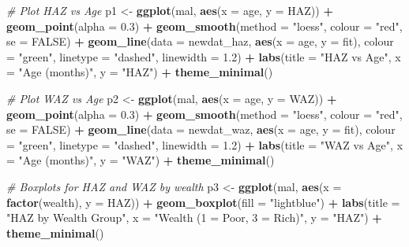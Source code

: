 \documentclass[
  letterpaper,
]{krantz}
\newenvironment{Shaded}{\begin{snugshade}}{\end{snugshade}}
\newcommand{\AttributeTok}[1]{\textcolor[rgb]{0.13,0.29,0.53}{#1}}
\newcommand{\CommentTok}[1]{\textcolor[rgb]{0.56,0.35,0.01}{\textit{#1}}}
\newcommand{\ConstantTok}[1]{\textcolor[rgb]{0.56,0.35,0.01}{#1}}
\newcommand{\FloatTok}[1]{\textcolor[rgb]{0.00,0.00,0.81}{#1}}
\newcommand{\FunctionTok}[1]{\textcolor[rgb]{0.13,0.29,0.53}{\textbf{#1}}}
\newcommand{\NormalTok}[1]{#1}
\newcommand{\OtherTok}[1]{\textcolor[rgb]{0.56,0.35,0.01}{#1}}
\newcommand{\SpecialCharTok}[1]{\textcolor[rgb]{0.81,0.36,0.00}{\textbf{#1}}}
\newcommand{\StringTok}[1]{\textcolor[rgb]{0.31,0.60,0.02}{#1}}
\begin{document}
\begin{Shaded}
\begin{Highlighting}[]
\CommentTok{\# Plot HAZ vs Age}
\NormalTok{p1 }\OtherTok{\textless{}{-}} \FunctionTok{ggplot}\NormalTok{(mal, }\FunctionTok{aes}\NormalTok{(}\AttributeTok{x =}\NormalTok{ age, }\AttributeTok{y =}\NormalTok{ HAZ)) }\SpecialCharTok{+}
  \FunctionTok{geom\_point}\NormalTok{(}\AttributeTok{alpha =} \FloatTok{0.3}\NormalTok{) }\SpecialCharTok{+}
  \FunctionTok{geom\_smooth}\NormalTok{(}\AttributeTok{method =} \StringTok{"loess"}\NormalTok{, }\AttributeTok{colour =} \StringTok{"red"}\NormalTok{, }\AttributeTok{se =} \ConstantTok{FALSE}\NormalTok{) }\SpecialCharTok{+}
  \FunctionTok{geom\_line}\NormalTok{(}\AttributeTok{data =}\NormalTok{ newdat\_haz, }\FunctionTok{aes}\NormalTok{(}\AttributeTok{x =}\NormalTok{ age, }\AttributeTok{y =}\NormalTok{ fit), }
            \AttributeTok{colour =} \StringTok{"green"}\NormalTok{, }\AttributeTok{linetype =} \StringTok{"dashed"}\NormalTok{, }\AttributeTok{linewidth =} \FloatTok{1.2}\NormalTok{) }\SpecialCharTok{+}
  \FunctionTok{labs}\NormalTok{(}\AttributeTok{title =} \StringTok{"HAZ vs Age"}\NormalTok{, }\AttributeTok{x =} \StringTok{"Age (months)"}\NormalTok{, }\AttributeTok{y =} \StringTok{"HAZ"}\NormalTok{) }\SpecialCharTok{+}
  \FunctionTok{theme\_minimal}\NormalTok{()}

\CommentTok{\# Plot WAZ vs Age}
\NormalTok{p2 }\OtherTok{\textless{}{-}} \FunctionTok{ggplot}\NormalTok{(mal, }\FunctionTok{aes}\NormalTok{(}\AttributeTok{x =}\NormalTok{ age, }\AttributeTok{y =}\NormalTok{ WAZ)) }\SpecialCharTok{+}
  \FunctionTok{geom\_point}\NormalTok{(}\AttributeTok{alpha =} \FloatTok{0.3}\NormalTok{) }\SpecialCharTok{+}
  \FunctionTok{geom\_smooth}\NormalTok{(}\AttributeTok{method =} \StringTok{"loess"}\NormalTok{, }\AttributeTok{colour =} \StringTok{"red"}\NormalTok{, }\AttributeTok{se =} \ConstantTok{FALSE}\NormalTok{) }\SpecialCharTok{+}
  \FunctionTok{geom\_line}\NormalTok{(}\AttributeTok{data =}\NormalTok{ newdat\_waz, }\FunctionTok{aes}\NormalTok{(}\AttributeTok{x =}\NormalTok{ age, }\AttributeTok{y =}\NormalTok{ fit), }
            \AttributeTok{colour =} \StringTok{"green"}\NormalTok{, }\AttributeTok{linetype =} \StringTok{"dashed"}\NormalTok{, }\AttributeTok{linewidth =} \FloatTok{1.2}\NormalTok{) }\SpecialCharTok{+}
  \FunctionTok{labs}\NormalTok{(}\AttributeTok{title =} \StringTok{"WAZ vs Age"}\NormalTok{, }\AttributeTok{x =} \StringTok{"Age (months)"}\NormalTok{, }\AttributeTok{y =} \StringTok{"WAZ"}\NormalTok{) }\SpecialCharTok{+}
  \FunctionTok{theme\_minimal}\NormalTok{()}

\CommentTok{\# Boxplots for HAZ and WAZ by wealth}
\NormalTok{p3 }\OtherTok{\textless{}{-}} \FunctionTok{ggplot}\NormalTok{(mal, }\FunctionTok{aes}\NormalTok{(}\AttributeTok{x =} \FunctionTok{factor}\NormalTok{(wealth), }\AttributeTok{y =}\NormalTok{ HAZ)) }\SpecialCharTok{+}
  \FunctionTok{geom\_boxplot}\NormalTok{(}\AttributeTok{fill =} \StringTok{"lightblue"}\NormalTok{) }\SpecialCharTok{+}
  \FunctionTok{labs}\NormalTok{(}\AttributeTok{title =} \StringTok{"HAZ by Wealth Group"}\NormalTok{, }\AttributeTok{x =} \StringTok{"Wealth (1 = Poor, 3 = Rich)"}\NormalTok{, }\AttributeTok{y =} \StringTok{"HAZ"}\NormalTok{) }\SpecialCharTok{+}
  \FunctionTok{theme\_minimal}\NormalTok{()}


\end{Highlighting}
\end{Shaded}
\end{document}
